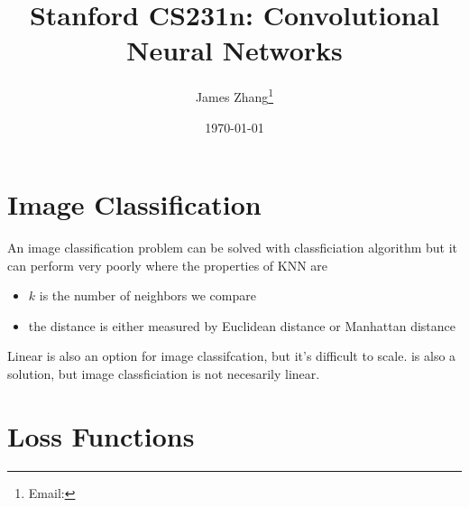 \documentclass[12pt]{scrartcl}
\begin{document}
\title{Stanford CS231n: Convolutional Neural Networks}
\author{James Zhang\thanks{Email: }}
\date{\today}



\maketitle
\newpage
\tableofcontents
\newpage

\section{Image Classification}

An image classification problem can be solved with 
classficiation algorithm but it can perform very poorly where the properties
of KNN are 
\begin{itemize}
  \item $k$ is the number of neighbors we compare
  \item the distance is either measured by Euclidean distance or Manhattan distance
\end{itemize}
Linear  is also an option for image classifcation, 
but it's difficult to scale.
 is also a solution, but image classficiation is not 
necesarily linear.

\section{Loss Functions}
\end{document}
